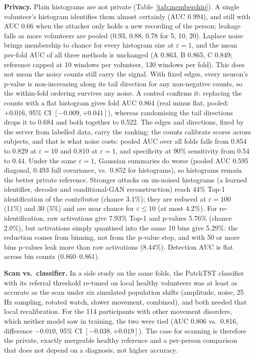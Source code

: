\documentclass{article}
\begin{document}
\textbf{Privacy.} Plain histograms are not private (Table~\ref{tab:membership}). A single volunteer's histogram identifies them almost certainly (AUC 0.994), and still with AUC 0.66 when the attacker only holds a new recording of the person; leakage falls as more volunteers are pooled (0.93, 0.88, 0.78 for 5, 10, 20). Laplace noise brings membership to chance for every histogram size at $\varepsilon{=}1$, and the mean per-fold AUC of all three methods is unchanged (A 0.863, B 0.865, C 0.849; reference capped at 10 windows per volunteer, 130 windows per fold). This does not mean the noisy counts still carry the signal. With fixed edges, every neuron's p-value is non-increasing along its tail direction for any non-negative counts, so the within-fold ordering survives any noise. A control confirms it: replacing the counts with a flat histogram gives fold AUC 0.864 (real minus flat, pooled: $+0.016$, 95\% CI $[-0.009, +0.041]$), whereas randomising the tail directions drops it to 0.684 and both together to 0.522. The edges and directions, fixed by the server from labelled data, carry the ranking; the counts calibrate scores across subjects, and that is what noise costs: pooled AUC over all folds falls from 0.854 to 0.829 at $\varepsilon{=}10$ and 0.810 at $\varepsilon{=}1$, and specificity at 90\% sensitivity from 0.54 to 0.44. Under the same $\varepsilon{=}1$, Gaussian summaries do worse (pooled AUC 0.595 diagonal, 0.493 full covariance, vs.\ 0.852 for histograms), so histograms remain the better private reference. Stronger attacks on un-noised histograms (a learned identifier, decoder and conditional-GAN reconstruction) reach 44\% Top-1 identification of the contributor (chance 3.1\%); they are reduced at $\varepsilon{=}100$ (11\%) and $30$ (5\%) and are near chance for $\varepsilon \leq 10$ (at most 4.2\%). For re-identification, raw activations give 7.93\% Top-1 and p-values 5.76\% (chance 2.0\%), but activations simply quantised into the same 10 bins give 5.29\%: the reduction comes from binning, not from the p-value step, and with 50 or more bins p-values leak more than raw activations (8.44\%). Detection AUC is flat across bin counts (0.860--0.861).

\textbf{Scan vs.\ classifier.} In a side study on the same folds, the PatchTST classifier with its referral threshold re-tuned on local healthy volunteers was at least as accurate as the scan under six simulated population shifts (amplitude, noise, 25\,Hz sampling, rotated watch, slower movement, combined), and both needed that local recalibration. For the 114 participants with other movement disorders, which neither model saw in training, the two were tied (AUC 0.806 vs.\ 0.816, difference $-0.010$, 95\% CI $[-0.038, +0.019]$). The case for scanning is therefore the private, exactly mergeable healthy reference and a per-person comparison that does not depend on a diagnosis, not higher accuracy.
\end{document}

